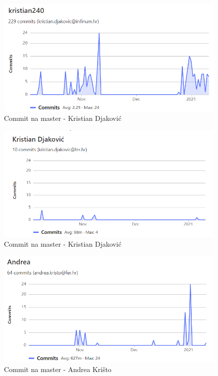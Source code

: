 \begin{figure}[H]
	\includegraphics[width=1\linewidth]{images/kd-git2.png}
	\caption{Commit na master - Kristian Djaković}
	\label{fig:Kristian Djaković - git2} 
\end{figure}
		\begin{figure}[H]
			\includegraphics[width=1\linewidth]{images/kd-git1.png}
			\caption{Commit na master - Kristian Djaković}
			\label{fig:Kristian Djaković - git} 
		\end{figure}
	
	
		\begin{figure}[H]
			\includegraphics[width=1\linewidth]{images/ak10-git.png}
			\caption{Commit na master - Andrea Krišto}
			\label{fig:Andrea Krišto - git} 
		\end{figure}
		
